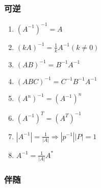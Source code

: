 \documentclass[a4paper,12pt]{article}
\begin{document}
    \subsubsection{可逆}

    \begin{enumerate}
        \item $(A^{-1})^{-1} = A$
        \item $(kA)^{-1} = \frac{1}{k}A^{-1}(k \neq 0)$
        \item $(AB)^{-1} = B^{-1}A^{-1}$
        \item $(ABC)^{-1} = C^{-1}B^{-1}A^{-1}$
        \item $(A^n)^{-1} = (A^{-1})^n$
        \item $(A^{-1})^T = (A^T)^{-1}$
        \item $|A^{-1}| = \frac{1}{|A|} \Rightarrow |p^{-1}||P| = 1$
        \item $A^{-1} = \frac{1}{|A|}A^{*}$
    \end{enumerate}

    \subsubsection{伴随}
\end{document}
